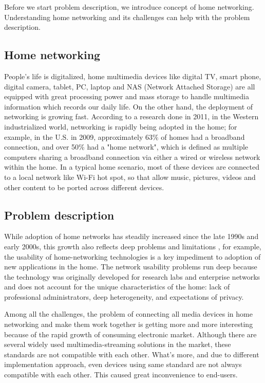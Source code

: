 
Before we start problem description, we introduce concept of home networking.
Understanding home networking and its challenges can help with the problem
description.

\subsection{Home networking}
People's life is digitalized, home multimedia devices like digital TV, smart phone, 
digital camera, tablet, PC, laptop and NAS (Network Attached Storage) are all equipped
 with great processing power and mass storage to handle multimedia information which 
 records our daily life. On the other hand, the deployment of networking is
 growing fast. According to a research \cite{stateofHN} done in 2011, in the
 Western industrialized world, networking is rapidly being adopted in the home;
 for example, in the U.S. in 2009, approximately 63\% of homes had a broadband
 connection, and over 50\% had a "home network", which is defined as multiple
 computers sharing a broadband connection via either a wired or wireless network within
 the home. In a typical home scenario, most of these devices are
 connected to a local network like Wi-Fi hot spot, so that allow music,
 pictures, videos and other content to be ported across different devices.

\subsection{Problem description}
While adoption of home networks has steadily increased since the late 1990s and
early 2000s, this growth also reflects deep problems and limitations
\cite{stateofHN}, for example, the usability of home-networking technologies is
a key impediment to adoption of new applications in the home. The network
usability problems run deep because the technology was originally developed for
research labs and enterprise networks and does not account for the unique
characteristics of the home: lack of professional administrators, deep
heterogeneity, and expectations of privacy.

Among all the challenges, the problem of connecting all media devices in home
networking and make them work together is getting more and more interesting
because of the rapid growth of consuming electronic market. Although there are
several widely used multimedia-streaming solutions in the market, these
standards are not compatible with each other. What's more, and due to different
implementation approach, even devices using same standard are not always
compatible with each other. This caused great inconvenience to end-users.

